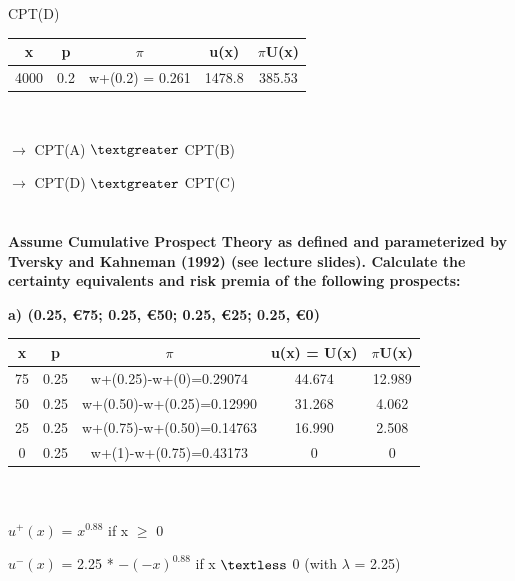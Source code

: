 \documentclass{article}
\begin{document}
CPT(D)

\begin{tabular}{|c|c|c|c|c|}
	\hline
	x    & p & $\pi$             & u(x) & $\pi$U(x) \\  \hline
	4000 & 0.2 & w+(0.2) = 0.261 & 1478.8  &  385.53 \\
	\hline
\end{tabular} \\

\vspace{1mm}

$\rightarrow$ CPT(A) $\textgreater$ CPT(B)  

 $\rightarrow$  CPT(D) $\textgreater$ CPT(C)

\section{}
 \textbf{Assume Cumulative Prospect Theory as defined and parameterized by Tversky and Kahneman (1992) (see lecture slides). Calculate the certainty equivalents and risk premia of the following prospects: } 
  
  \vspace{2mm}
  
\textbf{ a) (0.25, €75; 0.25, €50; 0.25, €25; 0.25, €0)} 

\vspace{2mm}

	\begin{tabular}{|c|c|c|c|c|}
		\hline
		x  & p    & $\pi$                         & u(x) = U(x) & $\pi$U(x)  \\ \hline
		75 & 0.25 & w+(0.25)-w+(0)=0.29074    & 44.674      & 12.989 \\ \hline
		50 & 0.25 & w+(0.50)-w+(0.25)=0.12990 & 31.268      & 4.062  \\ \hline
		25 & 0.25 & w+(0.75)-w+(0.50)=0.14763 & 16.990      & 2.508  \\ \hline
		0  & 0.25 & w+(1)-w+(0.75)=0.43173    & 0           & 0      \\ \hline
	\end{tabular} \\ \\



$u^+(x)$ = $x^{0.88}$ if x $\geq$ 0

$u^-(x)$ = 2.25 * $-(-x)^{0.88}$ if x $\textless$ 0     (with $\lambda$ = 2.25) \\

\Large
\end{document}
